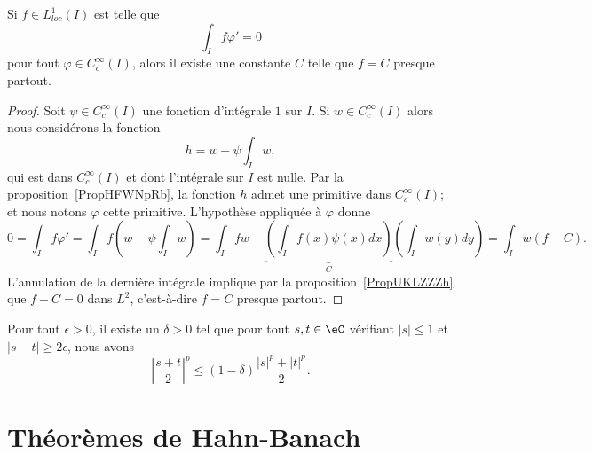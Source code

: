 \begin{proposition} \label{PropLGoLtcS}
    Si \( f\in L^1_{loc}(I)\) est telle que
    \begin{equation}
        \int_If\varphi'=0
    \end{equation}
    pour tout \( \varphi\in  C^{\infty}_c(I)\), alors il existe une constante \( C\) telle que \( f=C\) presque partout.
\end{proposition}

\begin{proof}
    Soit \( \psi\in C^{\infty}_c(I)\) une fonction d'intégrale \( 1\) sur \( I\). Si \( w\in C^{\infty}_c(I)\) alors nous considérons la fonction
    \begin{equation}
        h=w-\psi\int_Iw,
    \end{equation}
    qui est dans \(  C^{\infty}_c(I)\) et dont l'intégrale sur \( I\) est nulle. Par la proposition~\ref{PropHFWNpRb}, la fonction \( h\) admet une primitive dans \(  C^{\infty}_c(I)\); et nous notons \( \varphi\) cette primitive. L'hypothèse appliquée à \( \varphi\) donne
    \begin{equation}
        0=\int_If\varphi'=\int_If\left( w-\psi\int_Iw \right)=\int_Ifw-\underbrace{\left( \int_If(x)\psi(x)dx \right)}_C\left( \int_Iw(y)dy \right)=\int_Iw(f-C).
    \end{equation}
    L'annulation de la dernière intégrale implique par la proposition~\ref{PropUKLZZZh} que \( f-C=0\) dans \( L^2\), c'est-à-dire \( f=C\) presque partout.
\end{proof}

\begin{lemma}        \label{LEMooLDQRooEGWDlm}
    Pour tout \( \epsilon>0\), il existe un \( \delta>0\) tel que pour tout \( s,t\in \eC\) vérifiant \( | s |\leq 1\) et \( | s-t |\geq 2\epsilon\), nous avons
    \begin{equation}
        \left| \frac{ s+t }{ 2 } \right|^p\leq (1-\delta)\frac{ | s |^p+| t |^p }{2}.
    \end{equation}
\end{lemma}

\section{Théorèmes de Hahn-Banach}

